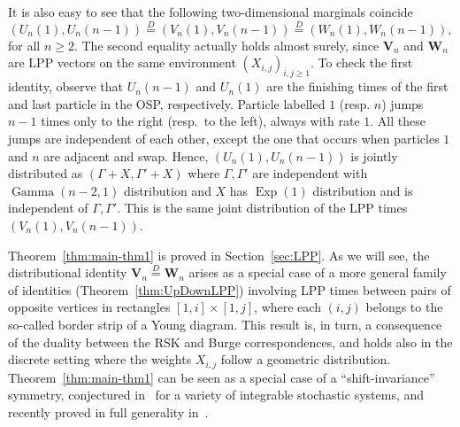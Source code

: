 \documentclass[a4paper,reqno,12pt]{amsart}
\theoremstyle{plain}
\theoremstyle{definition}
\newcommand{\1}{\mathbbm{1}}
\begin{document}
It is also easy to see that the following two-dimensional marginals coincide
\begin{equation}
\label{eq:special-marginal}
\left(U_n(1), U_n(n-1)\right) 
\overset{D}{=}
\left(V_n(1), V_n(n-1)\right)
\overset{D}{=}
\left(W_n(1), W_n(n-1)\right),
\end{equation}
for all $n \ge 2$.
The second equality actually holds almost surely, since  $\bm{V}_n$ and $\bm{W}_n$ are LPP vectors on the same environment $(X_{i,j})_{i,j\ge 1}$.
To check the first identity, observe that $U_n(n-1)$ and $U_n(1)$ are the finishing times of the first and last particle in the OSP, respectively.
Particle labelled $1$ (resp. $n$) jumps $n-1$ times only to the right (resp.\ to the left), always with rate $1$.
All these jumps are independent of each other, except the one that occurs when particles $1$ and $n$ are adjacent and swap.
Hence, $\left(U_n(1),U_n(n-1)\right)$ is jointly distributed as $(\Gamma+X, \Gamma'+X)$ where $\Gamma,\Gamma'$ are independent with $\operatorname{Gamma}(n-2,1)$ distribution and $X$ has $\operatorname{Exp}(1)$ distribution and is independent of $\Gamma,\Gamma'$.
This is the same joint distribution of the LPP times $\left(V_n(1), V_n(n-1)\right)$.

Theorem~\ref{thm:main-thm1} is proved in Section~\ref{sec:LPP}.
As we will see, the distributional identity $\bm{V}_n \overset{D}{=} \bm{W}_n$ arises as a special case of a more general family of identities (Theorem~\ref{thm:UpDownLPP}) involving LPP times between pairs of opposite vertices in rectangles $[1,i]\times [1,j]$, where each $(i,j)$ belongs to the so-called border strip of a Young diagram.
This result is, in turn, a consequence of the duality between the RSK and Burge correspondences, and holds also in the discrete setting where the weights $X_{i,j}$ follow a geometric distribution.
Theorem~\ref{thm:main-thm1} can be seen as a special case of a ``shift-invariance'' symmetry, conjectured in~\cite{borodinGorinWheeler19} for a variety of integrable stochastic systems, and recently proved in full generality in~\cite[Theorem~1.2]{dauvergne21}.
\end{document}
